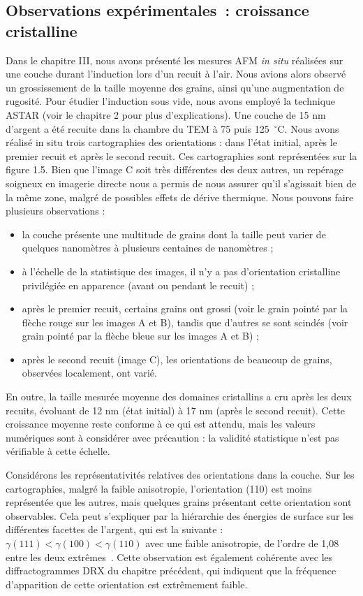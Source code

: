		\subsection{Observations expérimentales~: croissance cristalline}
Dans le chapitre III, nous avons présenté les mesures AFM \textit{in situ} réalisées sur une couche durant l’induction lors d’un recuit à l’air. Nous avions alors observé un grossissement de la taille moyenne des grains, ainsi qu’une augmentation de rugosité. Pour étudier l’induction sous vide, nous avons employé la technique ASTAR (voir le chapitre 2 pour plus d’explications). Une couche de 15 nm d’argent a été recuite dans la chambre du TEM à 75 puis 125~$^\circ$C. Nous avons réalisé in situ trois cartographies des orientations : dans l’état initial, après le premier recuit et après le second recuit. Ces cartographies sont représentées sur la figure 1.5. Bien que l’image C soit très différentes des deux autres, un repérage soigneux en imagerie directe nous a permis de nous assurer qu’il s’agissait bien de la même zone, malgré de possibles effets de dérive thermique. Nous pouvons faire plusieurs observations :
\begin{itemize}
\item la couche présente une multitude de grains dont la taille peut varier de quelques nanomètres à plusieurs centaines de nanomètres ;
\item à l'échelle de la statistique des images, il n’y a pas d’orientation cristalline privilégiée en apparence (avant ou pendant le recuit) ;
\item après le premier recuit, certains grains ont grossi (voir le grain pointé par la flèche rouge sur les images A et B), tandis que d’autres se sont scindés (voir grain pointé par la flèche bleue sur les images A et B) ;
\item après le second recuit (image C), les orientations de beaucoup de grains, observées localement, ont varié.
\end{itemize}
En outre, la taille mesurée moyenne des domaines cristallins a cru après les deux recuits, évoluant de 12 nm (état initial) à 17 nm (après le second recuit). Cette croissance moyenne reste conforme à ce qui est attendu, mais les valeurs numériques sont à considérer avec précaution : la validité statistique n’est pas vérifiable à cette échelle.\par 
Considérons les représentativités relatives des orientations dans la couche. Sur les cartographies, malgré la faible anisotropie, l’orientation (110) est moins représentée que les autres, mais quelques grains présentant cette orientation sont observables. Cela peut s’expliquer par la hiérarchie des énergies de surface sur les différentes facettes de l’argent, qui est la suivante : $\gamma(111) < \gamma(100) < \gamma(110)$ avec une faible anisotropie, de l’ordre de 1,08 entre les deux extrêmes~\cite{stankic2013equilibrium, molina2011size}. Cette observation est également cohérente avec les diffractogrammes DRX du chapitre précédent, qui indiquent que la fréquence d'apparition de cette orientation est extrêmement faible.\par 
